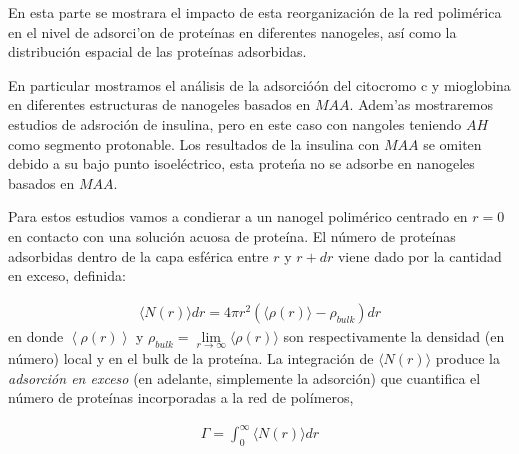 En esta parte se mostrara el impacto de esta reorganizaci\'on de la red  polim\'erica en el nivel de adsorci'on de prote\'inas en diferentes nanogeles, as\'i como la distribuci\'on espacial de las prote\'inas adsorbidas.

En particular mostramos el an\'alisis de la adsorció\'on del citocromo c y mioglobina en diferentes estructuras de nanogeles basados  en $MAA$.
Adem'as mostraremos estudios de adsroci\'on de insulina, pero en este caso con nangoles teniendo $AH$ como segmento protonable.
Los resultados de la insulina con $MAA$ se omiten debido a su bajo punto isoel\'ectrico, esta prote\'na no se adsorbe en nanogeles basados en $MAA$.  

Para estos estudios vamos a condierar a un nanogel polim\'erico centrado en $r=0$ en contacto con una soluci\'on acuosa de prote\'ina.
El n\'umero de prote\'inas adsorbidas dentro de la capa esf\'erica entre $r$ y $r+dr$ viene dado por la cantidad en exceso, definida: 

\begin{align}
     \langle N(r)\rangle dr = 4\pi r^2 \left(\langle\rho(r)\rangle - \rho_{bulk}\right) dr
\end{align}
%
en donde $\left<\rho(r)\right>$ y $\rho_{bulk}=\lim\limits_{r\to \infty } \langle\rho(r)\rangle$ son respectivamente la densidad (en n\'umero) local y en el bulk de la prote\'ina.
La integraci\'on de $\langle N(r)\rangle$ produce la \emph{adsorci\'on en exceso} (en adelante, simplemente la adsorci\'on) que cuantifica el n\'umero de prote\'inas incorporadas a la red de pol\'imeros,


%
\begin{align}
    \Gamma =  \int_0^\infty{  \langle N(r)\rangle dr}
\end{align}
%



